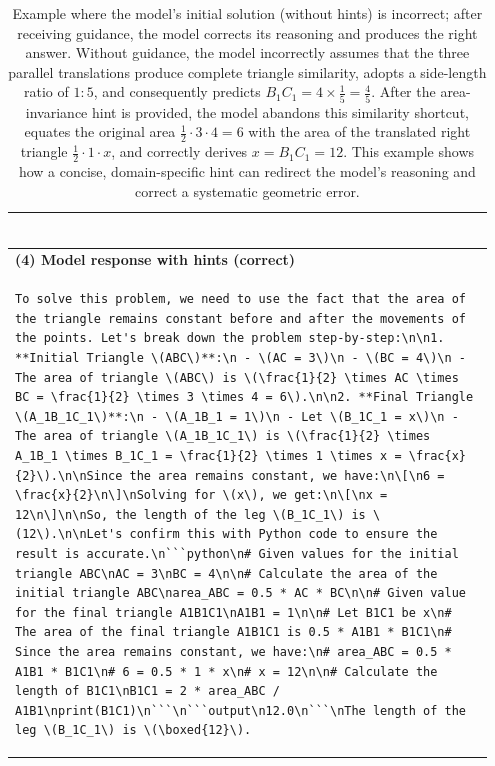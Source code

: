 \documentclass{article}
\begin{document}
{\begin{table}[H]
\begin{tabular}{|p{0.95\linewidth}|}
\begin{Verbatim}[fontsize=\scriptsize,breaklines=true]
\end{Verbatim}
\\ \hline
\textbf{(4) Model response with hints (correct)}\\[-0.2em]
\begin{Verbatim}[fontsize=\scriptsize,breaklines=true]
To solve this problem, we need to use the fact that the area of the triangle remains constant before and after the movements of the points. Let's break down the problem step-by-step:\n\n1. **Initial Triangle \(ABC\)**:\n - \(AC = 3\)\n - \(BC = 4\)\n - The area of triangle \(ABC\) is \(\frac{1}{2} \times AC \times BC = \frac{1}{2} \times 3 \times 4 = 6\).\n\n2. **Final Triangle \(A_1B_1C_1\)**:\n - \(A_1B_1 = 1\)\n - Let \(B_1C_1 = x\)\n - The area of triangle \(A_1B_1C_1\) is \(\frac{1}{2} \times A_1B_1 \times B_1C_1 = \frac{1}{2} \times 1 \times x = \frac{x}{2}\).\n\nSince the area remains constant, we have:\n\[\n6 = \frac{x}{2}\n\]\nSolving for \(x\), we get:\n\[\nx = 12\n\]\n\nSo, the length of the leg \(B_1C_1\) is \(12\).\n\nLet's confirm this with Python code to ensure the result is accurate.\n```python\n# Given values for the initial triangle ABC\nAC = 3\nBC = 4\n\n# Calculate the area of the initial triangle ABC\narea_ABC = 0.5 * AC * BC\n\n# Given value for the final triangle A1B1C1\nA1B1 = 1\n\n# Let B1C1 be x\n# The area of the final triangle A1B1C1 is 0.5 * A1B1 * B1C1\n# Since the area remains constant, we have:\n# area_ABC = 0.5 * A1B1 * B1C1\n# 6 = 0.5 * 1 * x\n# x = 12\n\n# Calculate the length of B1C1\nB1C1 = 2 * area_ABC / A1B1\nprint(B1C1)\n```\n```output\n12.0\n```\nThe length of the leg \(B_1C_1\) is \(\boxed{12}\).
\end{Verbatim}
\\ \hline
\end{tabular}
\vspace{2mm}
\caption{Example where the model’s initial solution (without hints) is incorrect; after receiving guidance, the model corrects its reasoning and produces the right answer. Without guidance, the model incorrectly assumes that the three parallel translations produce complete triangle similarity, adopts a side-length ratio of \(1{:}5\), and consequently predicts \(B_{1}C_{1}=4\times\frac15=\tfrac45\). After the area-invariance hint is provided, the model abandons this similarity shortcut, equates the original area \(\tfrac12\!\cdot\!3\!\cdot\!4=6\) with the area of the translated right triangle \(\tfrac12\!\cdot\!1\!\cdot\!x\), and correctly derives \(x=B_{1}C_{1}=12\). This example shows how a concise, domain-specific hint can redirect the model’s reasoning and correct a systematic geometric error.}
\label{tab:model_transcript_with_hints}
\end{table}

}
\end{document}
